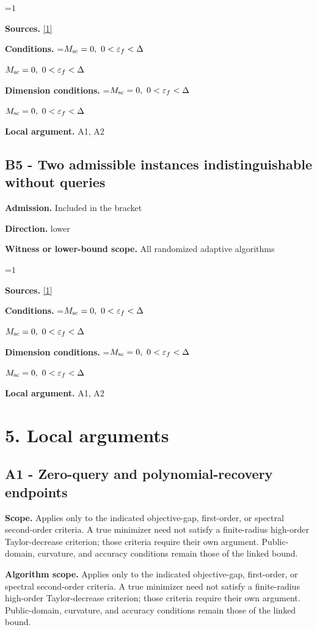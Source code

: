 \documentclass[10pt,a4paper]{article}
\newcommand{\AtlasMath}[1]{\par\begingroup\centering\setbox0=\hbox{$\displaystyle #1$}\ifdim\wd0>1.4\linewidth\typeout{ATLAS WIDE FORMULA: \the\wd0}\fi\ifdim\wd0>\linewidth\resizebox{\linewidth}{!}{\box0}\else\box0\fi\par\endgroup}
\newcommand{\AtlasInlineMath}[1]{\begingroup\setbox0=\hbox{$#1$}\ifdim\wd0>.4\linewidth\endgroup\AtlasMath{#1}\else\endgroup$#1$\fi}
\begin{document}
\AtlasMath{1}
\textbf{Sources.} \href{https://arxiv.org/pdf/2408.11022v1}{[1]}

\textbf{Conditions.} \AtlasInlineMath{M_{\rm sc}=0,\ 0<\varepsilon_f<\Delta}

\textbf{Dimension conditions.} \AtlasInlineMath{M_{\rm sc}=0,\ 0<\varepsilon_f<\Delta}

\textbf{Local argument.} A1, A2

\subsection{B5 - Two admissible instances indistinguishable without queries}
\textbf{Admission.} Included in the bracket

\textbf{Direction.} lower

\textbf{Witness or lower-bound scope.} All randomized adaptive algorithms

\AtlasMath{1}
\textbf{Sources.} \href{https://arxiv.org/pdf/2408.11022v1}{[1]}

\textbf{Conditions.} \AtlasInlineMath{M_{\rm sc}=0,\ 0<\varepsilon_f<\Delta}

\textbf{Dimension conditions.} \AtlasInlineMath{M_{\rm sc}=0,\ 0<\varepsilon_f<\Delta}

\textbf{Local argument.} A1, A2

\section{5. Local arguments}
\subsection{A1 - Zero-query and polynomial-recovery endpoints}
\textbf{Scope.} Applies only to the indicated objective-gap, first-order, or spectral second-order criteria. A true minimizer need not satisfy a finite-radius high-order Taylor-decrease criterion; those criteria require their own argument. Public-domain, curvature, and accuracy conditions remain those of the linked bound.

\textbf{Algorithm scope.} Applies only to the indicated objective-gap, first-order, or spectral second-order criteria. A true minimizer need not satisfy a finite-radius high-order Taylor-decrease criterion; those criteria require their own argument. Public-domain, curvature, and accuracy conditions remain those of the linked bound.
\end{document}
